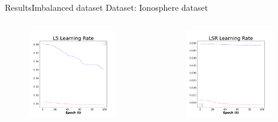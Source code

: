 \documentclass[
	aspectratio=169,	%
	onlytextwidth,		%
	t,					%
	]{beamer}
\begin{document}
		\begin{frame}[fragile]{Results}{Imbalanced dataset}
			\scriptsize
			Dataset: Ionosphere dataset~\cite{ion} 
			\newline
			
			\begin{columns}
				
			\begin{column}[T]{0.33\textwidth}
				\begin{figure}
					\includegraphics[width=0.9\textwidth]{myfigs/LS_i.png}
				\end{figure}
			\end{column}
			
			\begin{column}[T]{0.33\textwidth}
				\begin{figure}
					\includegraphics[width=0.9\textwidth]{myfigs/LSR_i.png}
				\end{figure}
			\end{column}
			

\end{columns}
\end{frame}
\end{document}
